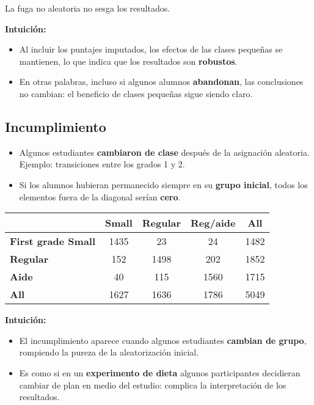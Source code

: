 \documentclass[12pt]{article}
\begin{document}
\footnotesize
La fuga no aleatoria no sesga los resultados.  
\normalsize

\textbf{Intuición:}
\begin{itemize}
    \item Al incluir los puntajes imputados, los efectos de las clases pequeñas se mantienen, lo que indica que los resultados son \textbf{robustos}.
    \item En otras palabras, incluso si algunos alumnos \textbf{abandonan}, las conclusiones no cambian: el beneficio de clases pequeñas sigue siendo claro.
\end{itemize}

\subsection*{\noindent\textbf{Incumplimiento}}

\begin{itemize}
    \item Algunos estudiantes \textbf{cambiaron de clase} después de la asignación aleatoria. Ejemplo: transiciones entre los grados 1 y 2.
    \item Si los alumnos hubieran permanecido siempre en su \textbf{grupo inicial}, todos los elementos fuera de la diagonal serían \textbf{cero}.
\end{itemize}

\begin{table}[H]
\centering
\begin{tabular}{lcccc}
 & \textbf{Small} & \textbf{Regular} & \textbf{Reg/aide} & \textbf{All} \\
\hline
\textbf{First grade Small} & 1435 & 23 & 24 & 1482 \\
\textbf{Regular} & 152 & 1498 & 202 & 1852 \\
\textbf{Aide} & 40 & 115 & 1560 & 1715 \\
\textbf{All} & 1627 & 1636 & 1786 & 5049 \\
\end{tabular}
\end{table}

\textbf{Intuición:}
\begin{itemize}
    \item El incumplimiento aparece cuando algunos estudiantes \textbf{cambian de grupo}, rompiendo la pureza de la aleatorización inicial.
    \item Es como si en un \textbf{experimento de dieta} algunos participantes decidieran cambiar de plan en medio del estudio: complica la interpretación de los resultados.
\end{itemize}
\end{document}
